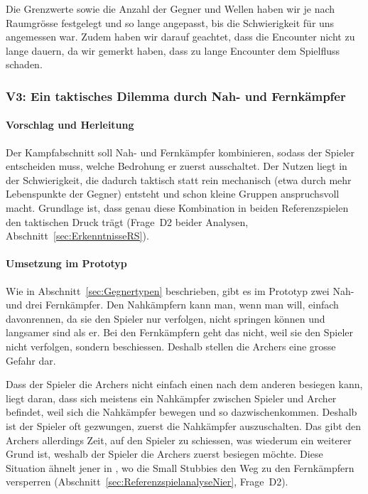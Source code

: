 \documentclass[../Main.tex]{subfiles}
\begin{document}
Die Grenzwerte sowie die Anzahl der Gegner und Wellen haben wir je nach Raumgrösse festgelegt und so lange angepasst, bis die Schwierigkeit für uns angemessen war. Zudem haben wir darauf geachtet, dass die Encounter nicht zu lange dauern, da wir gemerkt haben, dass zu lange Encounter dem Spielfluss schaden.

\subsubsection{V3: Ein taktisches Dilemma durch Nah- und Fernkämpfer} \label{sec:V3}

\paragraph{Vorschlag und Herleitung}
Der Kampfabschnitt soll Nah- und Fernkämpfer kombinieren, sodass der Spieler entscheiden muss, welche Bedrohung er zuerst ausschaltet. Der Nutzen liegt in der Schwierigkeit, die dadurch taktisch statt rein mechanisch (etwa durch mehr Lebenspunkte der Gegner) entsteht und schon kleine Gruppen anspruchsvoll macht. Grundlage ist, dass genau diese Kombination in beiden Referenzspielen den taktischen Druck trägt (Frage~D2 beider Analysen, Abschnitt~\ref{sec:ErkenntnisseRS}).

\paragraph{Umsetzung im Prototyp}
Wie in Abschnitt~\ref{sec:Gegnertypen} beschrieben, gibt es im Prototyp zwei Nah- und drei Fernkämpfer. Den Nahkämpfern kann man, wenn man will, einfach davonrennen, da sie den Spieler nur verfolgen, nicht springen können und langsamer sind als er. Bei den Fernkämpfern geht das nicht, weil sie den Spieler nicht verfolgen, sondern beschiessen. Deshalb stellen die Archers eine grosse Gefahr dar.

Dass der Spieler die Archers nicht einfach einen nach dem anderen besiegen kann, liegt daran, dass sich meistens ein Nahkämpfer zwischen Spieler und Archer befindet, weil sich die Nahkämpfer bewegen und so dazwischenkommen. Deshalb ist der Spieler oft gezwungen, zuerst die Nahkämpfer auszuschalten. Das gibt den Archers allerdings Zeit, auf den Spieler zu schiessen, was wiederum ein weiterer Grund ist, weshalb der Spieler die Archers zuerst besiegen möchte. Diese Situation ähnelt jener in , wo die Small Stubbies den Weg zu den Fernkämpfern versperren (Abschnitt~\ref{sec:ReferenzspielanalyseNier}, Frage~D2).
\end{document}

